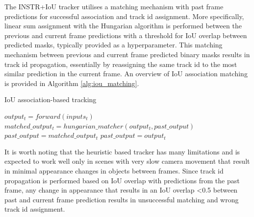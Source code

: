 The INSTR+IoU tracker utilises a matching mechanism with past frame predictions for successful association and track id assignment. More specifically, linear sum assignment with the Hungarian algorithm is performed between the previous and current frame predictions with a threshold for IoU overlap between predicted masks, typically provided as a hyperparameter. This matching mechanism between previous and current frame predicted binary masks results in track id propagation, essentially by reassigning the same track id to the most similar prediction in the current frame. An overview of IoU association matching is provided in Algorithm \ref{alg:iou_matching}.

\begin{algorithm}
\caption{IoU association-based tracking}\label{alg:iou_matching}
\begin{algorithmic}[1]


\State $output_t = forward(inputs_t)$
    \State $matched\_output_{t} = hungarian\_matcher(output_t, past\_output)$
    \State $past\_output = matched\_output_{t}$
\Else
    \State $past\_output = output_t$
\EndIf

\EndWhile

\end{algorithmic}
\end{algorithm}

\newpage
It is worth noting that the heuristic based tracker has many limitations and is expected to work well only in scenes with very slow camera movement that result in minimal appearance changes in objects between frames. Since track id propagation is performed based on IoU overlap with predictions from the past frame, any change in appearance that results in an IoU overlap <0.5 between past and current frame prediction results in unsuccessful matching and wrong track id assignment. \par







